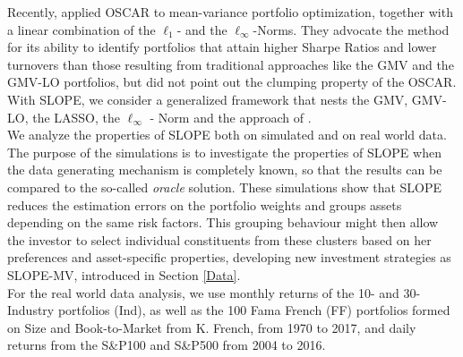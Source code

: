 \documentclass[12pt, a4paper]{article}
\begin{document}
Recently, \cite{Xing2014} applied OSCAR to mean-variance portfolio optimization, together with a linear combination of the $\ell_1$- and the $\ell_\infty$-Norms. They advocate the method for its ability to identify portfolios that attain higher Sharpe Ratios and lower turnovers than those resulting from traditional approaches like the GMV and the GMV-LO portfolios, but did not point out the clumping property of the OSCAR. With SLOPE, we consider a generalized framework that nests the GMV, GMV-LO, the LASSO, the $\ell_{\infty}$ - Norm and the approach of \cite{Xing2014}.\\
We analyze the properties of SLOPE both on simulated and on real world data. The purpose of the simulations is to investigate the properties of SLOPE when the data generating mechanism is completely known, so that the results can be compared to the so-called \textit{oracle} solution. These simulations show that SLOPE reduces the estimation errors on the portfolio weights and groups assets depending on the same risk factors. This grouping behaviour might then allow the investor to select individual constituents from these clusters based on her preferences and asset-specific properties, developing new investment strategies as SLOPE-MV, introduced in Section \ref{Data}. \\
For the real world data analysis, we use monthly returns of the 10- and 30-Industry portfolios (Ind), as well as the 100 Fama French (FF) portfolios formed on Size and Book-to-Market from K. French, from 1970 to 2017, and daily returns from the S\&P100 and S\&P500 from 2004 to 2016. 
\end{document}
